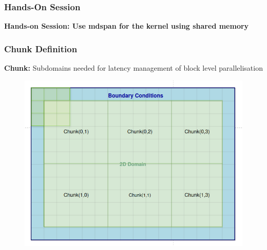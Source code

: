 \documentclass[9pt]{beamer}
\begin{document}
\begin{frame}
\frametitle{Hands-On Session}
\begin{center}
      \Huge \textbf{Hands-on Session: Use mdspan for the kernel using shared memory}
  \end{center}
\end{frame}
%
\begin{frame}
\frametitle{Chunk Definition}
\textbf{Chunk:} Subdomains needed for latency management of block level parallelisation
\vspace{-0.5\baselineskip}
\begin{figure}
    \centering
    \includegraphics[width=0.85\linewidth]{Screenshot from 2024-09-02 14-11-22.png}
    \label{fig:enter-label}
\end{figure}
\end{frame}
\end{document}

